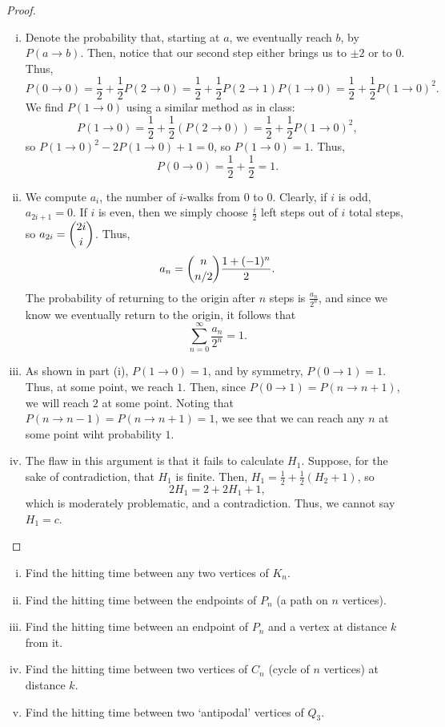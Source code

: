 \documentclass[11pt]{scrartcl}
\begin{document}
\begin{proof}
    \begin{enumerate}[(i)]
        \item Denote the probability that, starting at $a$, we eventually reach $b$, by $P(a\to b)$. Then, notice that our second step either brings us to $\pm 2$ or to $0$. Thus, \[P(0\to 0)=\frac12+\frac12P(2\to 0)=\frac12+\frac12P(2\to1)P(1\to0)=\frac12+\frac12P(1\to 0)^2.\]
        We find $P(1\to0)$ using a similar method as in class:
        \[P(1\to 0)=\frac12+\frac12(P(2\to 0))=\frac12+\frac12 P(1\to0)^2,\] so $P(1\to0)^2-2P(1\to 0)+1=0$, so $P(1\to 0)=1$. Thus, \[P(0\to 0)=\frac12+\frac12=1.\]
        \item We compute $a_i$, the number of $i$-walks from $0$ to $0$. Clearly, if $i$ is odd, $a_{2i+1}=0$. If $i$ is even, then we simply choose $\frac{i}2$ left steps out of $i$ total steps, so $a_{2i}=\dbinom{2i}{i}$. Thus, \[a_n=\dbinom{n}{n/2}\frac{1+(-1)^n}{2}.\] The probability of returning to the origin after $n$ steps is $\frac{a_n}{2^n}$, and since we know we eventually return to the origin, it follows that \[\sum_{n=0}^{\infty}\frac{a_n}{2^n}=1.\]
        \item As shown in part (i), $P(1\to 0)=1$, and by symmetry, $P(0\to 1)=1$. Thus, at some point, we reach $1$. Then, since $P(0\to 1)=P(n\to n+1)$, we will reach $2$ at some point. Noting that $P(n\to n-1)=P(n\to n+1)=1$, we see that we can reach any $n$ at some point wiht probability $1$.
        \item The flaw in this argument is that it fails to calculate $H_1$. Suppose, for the sake of contradiction, that $H_1$ is finite. Then, $H_1=\frac{1}{2}+\frac{1}{2}(H_2+1)$, so \[2H_1=2+2H_1+1,\] which is moderately problematic, and a contradiction. Thus, we cannot say $H_1=c$.
    \end{enumerate}
\end{proof}
\begin{problem}[\textcolor{red}{Some examples of Hitting times}]\phantom{0}

    \begin{enumerate}[(i)]
        \item Find the hitting time between any two vertices of $K_n$.
        \item Find the hitting time between the endpoints of $P_n$ (a path on $n$ vertices).
        \item Find the hitting time between an endpoint of $P_n$ and a vertex at distance $k$ from it.
        \item Find the hitting time between two vertices of $C_n$ (cycle of $n$ vertices) at distance $k$.
        \item Find the hitting time between two `antipodal' vertices of $Q_3$.
    \end{enumerate}
\end{problem}
\end{document}
